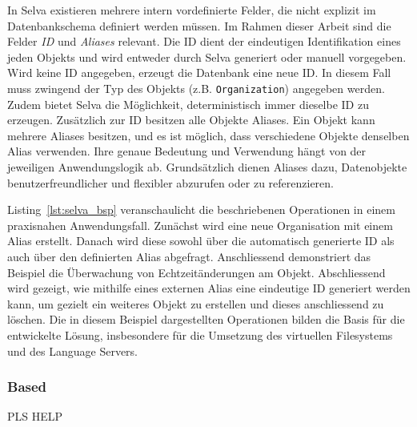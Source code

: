 In Selva existieren mehrere intern vordefinierte Felder, die nicht explizit im Datenbankschema definiert werden müssen. Im Rahmen dieser Arbeit sind die Felder \textit{ID} und \textit{Aliases} relevant. Die ID dient der eindeutigen Identifikation eines jeden Objekts und wird entweder durch Selva generiert oder manuell vorgegeben. Wird keine ID angegeben, erzeugt die Datenbank eine neue ID. In diesem Fall muss zwingend der Typ des Objekts (z.B. \texttt{Organization}) angegeben werden. Zudem bietet Selva die Möglichkeit, deterministisch immer dieselbe ID zu erzeugen. Zusätzlich zur ID besitzen alle Objekte Aliases. Ein Objekt kann mehrere Aliases besitzen, und es ist möglich, dass verschiedene Objekte denselben Alias verwenden. Ihre genaue Bedeutung und Verwendung hängt von der jeweiligen Anwendungslogik ab. Grundsätzlich dienen Aliases dazu, Datenobjekte benutzerfreundlicher und flexibler abzurufen oder zu referenzieren.

Listing~\ref{lst:selva_bsp} veranschaulicht die beschriebenen Operationen in einem praxisnahen Anwendungsfall. Zunächst wird eine neue Organisation mit einem Alias erstellt. Danach wird diese sowohl über die automatisch generierte ID als auch über den definierten Alias abgefragt. Anschliessend demonstriert das Beispiel die Überwachung von Echtzeitänderungen am Objekt. Abschliessend wird gezeigt, wie mithilfe eines externen Alias eine eindeutige ID generiert werden kann, um gezielt ein weiteres Objekt zu erstellen und dieses anschliessend zu löschen. Die in diesem Beispiel dargestellten Operationen bilden die Basis für die entwickelte Lösung, insbesondere für die Umsetzung des virtuellen Filesystems und des Language Servers.

\newpage




\subsubsection*{Based}
PLS HELP
